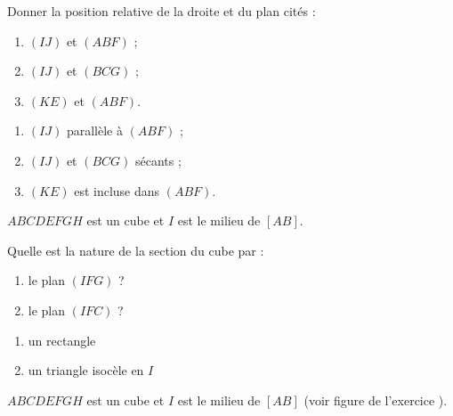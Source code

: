 \begin{colonne*exercice}
\begin{exercice*}\label{G2Exo3}
  Donner la position relative de la droite et du plan cités :
  \begin{enumerate}
  \item $(IJ)$ et $(ABF)$ ;
  \item $(IJ)$ et $(BCG)$ ;
  \item $(KE)$ et $(ABF)$.
  \end{enumerate}
\end{exercice*}
\begin{corrige}
  \begin{enumerate}
  \item $(IJ)$ parallèle à $(ABF)$ ;
  \item $(IJ)$ et $(BCG)$ sécants ;
  \item $(KE)$ est incluse dans $(ABF)$.
  \end{enumerate}  
\end{corrige}

\begin{exercice*}\label{G2Exo4}
  $ABCDEFGH$ est un cube et $I$ est le milieu de $[AB]$.

  \begin{center}
    
  \end{center}

  Quelle est la nature de la section du cube par :
  \begin{enumerate}
  \item le plan $(IFG)$ ?
  \item le plan $(IFC)$ ?
  \end{enumerate}
\end{exercice*}
\begin{corrige}
\begin{enumerate}
\item un rectangle
\item un triangle isocèle en $I$
\end{enumerate}
\end{corrige}

\columnbreak

\begin{exercice*}
  $ABCDEFGH$ est un cube et $I$ est le milieu de $[AB]$ (voir figure
  de l'exercice ).


\end{exercice*}
\end{colonne*exercice}
